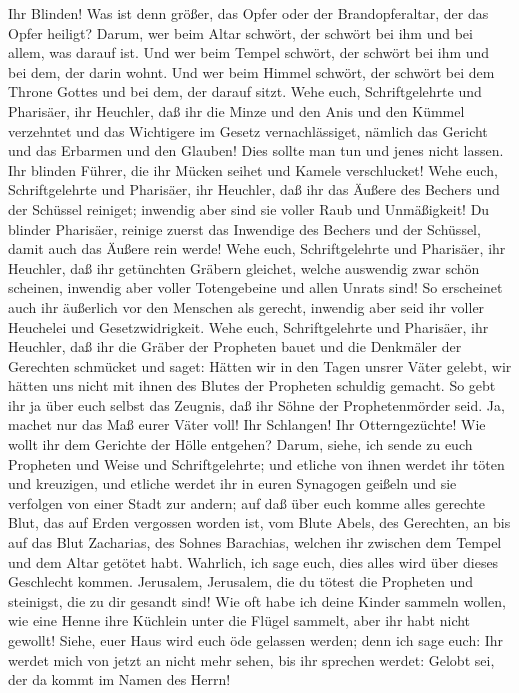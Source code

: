  Ihr Blinden! Was ist denn größer, das Opfer oder der
Brandopferaltar, der das Opfer heiligt?  Darum, wer beim
Altar schwört, der schwört bei ihm und bei allem, was darauf ist.
 Und wer beim Tempel schwört, der schwört bei ihm und bei
dem, der darin wohnt.  Und wer beim Himmel schwört, der
schwört bei dem Throne Gottes und bei dem, der darauf sitzt.
 Wehe euch, Schriftgelehrte und Pharisäer, ihr Heuchler,
daß ihr die Minze und den Anis und den Kümmel verzehntet und das
Wichtigere im Gesetz vernachlässiget, nämlich das Gericht und das
Erbarmen und den Glauben! Dies sollte man tun und jenes nicht lassen.
 Ihr blinden Führer, die ihr Mücken seihet und Kamele
verschlucket!  Wehe euch, Schriftgelehrte und Pharisäer,
ihr Heuchler, daß ihr das Äußere des Bechers und der Schüssel reiniget;
inwendig aber sind sie voller Raub und Unmäßigkeit!  Du
blinder Pharisäer, reinige zuerst das Inwendige des Bechers und der
Schüssel, damit auch das Äußere rein werde!  Wehe euch,
Schriftgelehrte und Pharisäer, ihr Heuchler, daß ihr getünchten Gräbern
gleichet, welche auswendig zwar schön scheinen, inwendig aber voller
Totengebeine und allen Unrats sind!  So erscheinet auch
ihr äußerlich vor den Menschen als gerecht, inwendig aber seid ihr
voller Heuchelei und Gesetzwidrigkeit.  Wehe euch,
Schriftgelehrte und Pharisäer, ihr Heuchler, daß ihr die Gräber der
Propheten bauet und die Denkmäler der Gerechten schmücket
 und saget: Hätten wir in den Tagen unsrer Väter gelebt,
wir hätten uns nicht mit ihnen des Blutes der Propheten schuldig
gemacht.  So gebt ihr ja über euch selbst das Zeugnis,
daß ihr Söhne der Prophetenmörder seid.  Ja, machet nur
das Maß eurer Väter voll!  Ihr Schlangen! Ihr
Otterngezüchte! Wie wollt ihr dem Gerichte der Hölle entgehen?
 Darum, siehe, ich sende zu euch Propheten und Weise und
Schriftgelehrte; und etliche von ihnen werdet ihr töten und kreuzigen,
und etliche werdet ihr in euren Synagogen geißeln und sie verfolgen von
einer Stadt zur andern;  auf daß über euch komme alles
gerechte Blut, das auf Erden vergossen worden ist, vom Blute Abels, des
Gerechten, an bis auf das Blut Zacharias, des Sohnes Barachias, welchen
ihr zwischen dem Tempel und dem Altar getötet habt. 
Wahrlich, ich sage euch, dies alles wird über dieses Geschlecht kommen.
 Jerusalem, Jerusalem, die du tötest die Propheten und
steinigst, die zu dir gesandt sind! Wie oft habe ich deine Kinder
sammeln wollen, wie eine Henne ihre Küchlein unter die Flügel sammelt,
aber ihr habt nicht gewollt!  Siehe, euer Haus wird euch
öde gelassen werden;  denn ich sage euch: Ihr werdet mich
von jetzt an nicht mehr sehen, bis ihr sprechen werdet: Gelobt sei, der
da kommt im Namen des Herrn!

